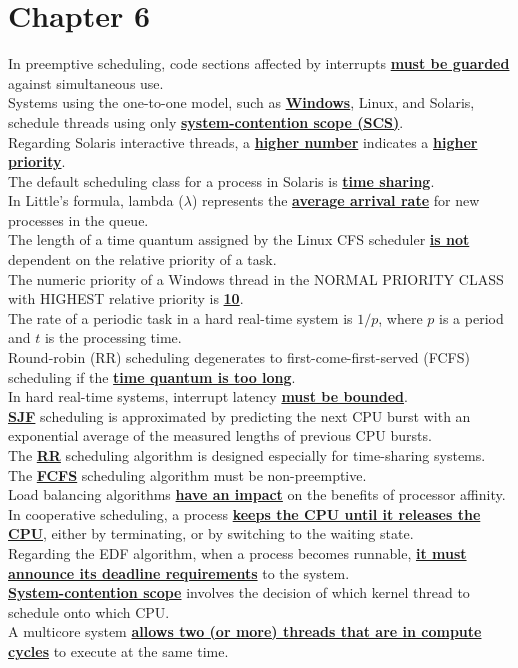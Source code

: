 \documentclass[10pt]{article}
\newcommand{\qw}[1]{\textbf{\ul{#1}}}
\begin{document}
\section*{\centering Chapter 6}
In preemptive scheduling, code sections affected by interrupts \qw{must be guarded} against simultaneous use.\\[2mm]
Systems using the one-to-one model, such as \qw{Windows}, Linux, and Solaris, schedule threads using only \qw{system-contention scope (SCS)}.\\[2mm]
Regarding Solaris interactive threads, a \qw{higher number} indicates a \qw{higher priority}.\\[2mm]
The default scheduling class for a process in Solaris is \qw{time sharing}.\\[2mm]
In Little's formula, lambda ($\lambda$) represents the \qw{average arrival rate} for new processes in the queue.\\[2mm]
The length of a time quantum assigned by the Linux CFS scheduler \qw{is not} dependent on the relative priority of a task.\\[2mm]
The numeric priority of a Windows thread in the NORMAL PRIORITY CLASS with HIGHEST relative priority is \qw{10}.\\[2mm]
The rate of a periodic task in a hard real-time system is \qw{$1/p$}, where $p$ is a period and $t$ is the processing time.\\[2mm]
Round-robin (RR) scheduling degenerates to first-come-first-served (FCFS) scheduling if the \qw{time quantum is too long}.\\[2mm]
In hard real-time systems, interrupt latency \qw{must be bounded}.\\[2mm]
\qw{SJF} scheduling is approximated by predicting the next CPU burst with an exponential average of the measured lengths of previous CPU bursts.\\[2mm]
The \qw{RR} scheduling algorithm is designed especially for time-sharing systems.\\[2mm]
The \qw{FCFS} scheduling algorithm must be non-preemptive.\\[2mm]
Load balancing algorithms \qw{have an impact} on the benefits of processor affinity.\\[2mm]
In cooperative scheduling, a process \qw{keeps the CPU until it releases the CPU}, either by terminating, or by switching to the waiting state.\\[2mm]
Regarding the EDF algorithm, when a process becomes runnable, \qw{it must announce its deadline requirements} to the system.\\[2mm]
\qw{System-contention scope} involves the decision of which kernel thread to schedule onto which CPU.\\[2mm]
A multicore system \qw{allows two (or more) threads that are in compute cycles} to execute at the same time.
\newpage
\end{document}
